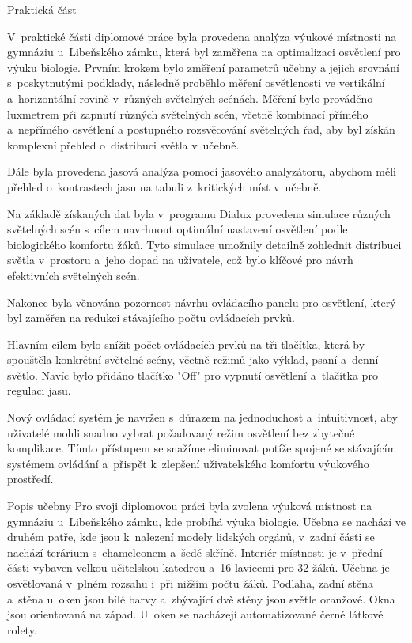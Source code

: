 \chap Praktická část

V~praktické části diplomové práce byla provedena analýza výukové místnosti na gymnáziu u~Libeňského zámku,
která byl zaměřena na optimalizaci osvětlení pro výuku biologie.
Prvním krokem bylo změření parametrů učebny a jejich srovnání s~poskytnutými podklady, následně proběhlo měření
osvětlenosti ve vertikální a~horizontální rovině v~různých světelných scénách.
Měření bylo prováděno luxmetrem při zapnutí různých světelných scén, včetně kombinací přímého a~nepřímého osvětlení
a postupného rozsvěcování světelných řad,
 aby byl získán komplexní přehled o~distribuci světla v~učebně.


Dále byla provedena jasová analýza pomocí jasového analyzátoru, abychom měli přehled o~kontrastech jasu na tabuli
z~kritických míst v~učebně.


Na základě získaných dat byla v~programu Dialux provedena simulace různých světelných scén s~cílem navrhnout optimální
nastavení osvětlení podle biologického komfortu žáků.
Tyto simulace umožnily detailně zohlednit distribuci světla v~prostoru a~jeho dopad na uživatele, což bylo
klíčové pro návrh efektivních světelných scén.


Nakonec byla věnována pozornost návrhu ovládacího panelu pro osvětlení, který byl zaměřen na redukci stávajícího
počtu ovládacích prvků.


Hlavním cílem bylo snížit počet ovládacích prvků na tři tlačítka, která by spouštěla konkrétní světelné scény,
včetně režimů jako výklad, psaní a~denní světlo. Navíc bylo přidáno tlačítko "Off" pro vypnutí osvětlení a~tlačítka pro regulaci jasu.


Nový ovládací systém je navržen s~důrazem na jednoduchost a~intuitivnost, aby uživatelé mohli snadno vybrat
požadovaný režim osvětlení bez zbytečné komplikace. Tímto přístupem se snažíme eliminovat potíže spojené
se stávajícím systémem ovládání a~přispět k~zlepšení uživatelského komfortu výukového prostředí.

\sec Popis učebny
Pro svoji diplomovou práci byla zvolena výuková místnost na gymnáziu u~Libeňského zámku, kde probíhá výuka
biologie. Učebna se nachází ve druhém patře, kde jsou k~nalezení modely lidských orgánů, v~zadní části se nachází
terárium s~chameleonem a~šedé skříně. Interiér místnosti je v~přední části vybaven velkou učitelskou katedrou
a~16 lavicemi pro 32 žáků. Učebna je osvětlovaná v~plném rozsahu i~při nižším počtu žáků. Podlaha, zadní stěna
a~stěna u~oken jsou bílé barvy a~zbývající dvě stěny jsou světle oranžové. Okna jsou orientovaná na západ.
U~oken se nacházejí automatizované černé látkové rolety.


